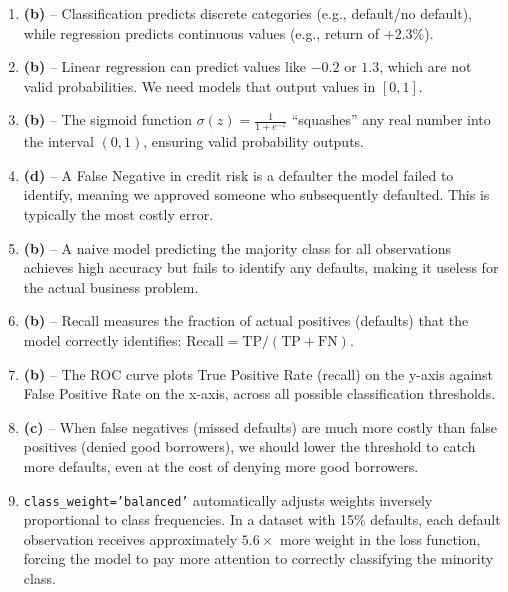 \documentclass[11pt]{article}
\begin{document}
\begin{enumerate}[label=\textbf{\arabic*.}, leftmargin=*, itemsep=6pt]
  \item \textbf{(b)} -- Classification predicts discrete categories (e.g., default/no default), while regression predicts continuous values (e.g., return of $+2.3\%$).
  
  \item \textbf{(b)} -- Linear regression can predict values like $-0.2$ or $1.3$, which are not valid probabilities. We need models that output values in $[0, 1]$.
  
  \item \textbf{(b)} -- The sigmoid function $\sigma(z) = \frac{1}{1 + e^{-z}}$ ``squashes'' any real number into the interval $(0, 1)$, ensuring valid probability outputs.
  
  \item \textbf{(d)} -- A False Negative in credit risk is a defaulter the model failed to identify, meaning we approved someone who subsequently defaulted. This is typically the most costly error.
  
  \item \textbf{(b)} -- A naive model predicting the majority class for all observations achieves high accuracy but fails to identify any defaults, making it useless for the actual business problem.
  
  \item \textbf{(b)} -- Recall measures the fraction of actual positives (defaults) that the model correctly identifies: $\text{Recall} = \text{TP} / (\text{TP} + \text{FN})$.
  
  \item \textbf{(b)} -- The ROC curve plots True Positive Rate (recall) on the y-axis against False Positive Rate on the x-axis, across all possible classification thresholds.
  
  \item \textbf{(c)} -- When false negatives (missed defaults) are much more costly than false positives (denied good borrowers), we should lower the threshold to catch more defaults, even at the cost of denying more good borrowers.
  
  \item \texttt{class\_weight='balanced'} automatically adjusts weights inversely proportional to class frequencies. In a dataset with 15\% defaults, each default observation receives approximately $5.6\times$ more weight in the loss function, forcing the model to pay more attention to correctly classifying the minority class.
\end{enumerate}
\end{document}
